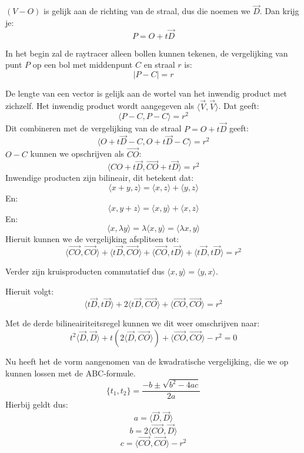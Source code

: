\documentclass[12pt, a4paper]{article}
\begin{document}
$(V-O)$ is gelijk aan de richting van de straal, dus die noemen we $\overrightarrow{D}$. Dan krijg je:
\[P=O+t\overrightarrow{D}\]

In het begin zal de raytracer alleen bollen kunnen tekenen, de vergelijking van punt $P$ op een bol met middenpunt $C$ en straal $r$ is:
\[|P-C|=r\]

De lengte van een vector is gelijk aan de wortel van het inwendig product met zichzelf. Het inwendig product wordt aangegeven als $\langle\overrightarrow{V},\overrightarrow{V} \rangle$. Dat geeft:
\[\langle P-C,P-C\rangle=r^2\]
Dit combineren met de vergelijking van de straal $P=O+t\overrightarrow{D}$ geeft:
\[\langle O+t\overrightarrow{D}-C,O+t\overrightarrow{D}-C\rangle=r^2\]
$O-C$ kunnen we opschrijven als $\overrightarrow{CO}$:
\[\langle{CO}+t\overrightarrow{D},\overrightarrow{CO}+t\overrightarrow{D}\rangle=r^2\]
Inwendige producten zijn bilineair, dit betekent dat:
\[\langle x+y,z\rangle=\langle x,z\rangle+\langle y,z\rangle\]
En:
\[\langle x,y+z\rangle=\langle x,y\rangle+\langle x,z\rangle\]
En:
\[\langle x,\lambda y\rangle=\lambda\langle x,y\rangle=\langle\lambda x,y\rangle\]
Hieruit kunnen we de vergelijking afsplitsen tot:
\[\langle \overrightarrow{CO},\overrightarrow{CO} \rangle + \langle t\overrightarrow{D},\overrightarrow{CO} \rangle + \langle \overrightarrow{CO},t\overrightarrow{D} \rangle + \langle t\overrightarrow{D},t\overrightarrow{D} \rangle = r^2\]

Verder zijn kruisproducten commutatief dus $\langle x,y\rangle=\langle y,x\rangle$.

Hieruit volgt:
\[\langle t\overrightarrow{D},t\overrightarrow{D} \rangle + 2\langle t\overrightarrow{D},\overrightarrow{CO} \rangle + \langle \overrightarrow{CO},\overrightarrow{CO} \rangle = r^2\]

Met de derde bilineairiteitsregel kunnen we dit weer omschrijven naar:
\[t^2\langle \overrightarrow{D},\overrightarrow{D} \rangle + t\left(2\langle \overrightarrow{D},\overrightarrow{CO} \rangle
\right) + \langle \overrightarrow{CO},\overrightarrow{CO} \rangle - r^2 = 0\]

Nu heeft het de vorm aangenomen van de kwadratische vergelijking, die we op kunnen lossen met de ABC-formule.
\[\{t_1, t_2\}=\frac{-b\pm \sqrt{b^2-4ac}}{2a}\]
Hierbij geldt dus:
\[a=\langle \overrightarrow{D},\overrightarrow{D}\rangle\]
\[b=2\langle \overrightarrow{CO},\overrightarrow{D}\rangle\]
\[c=\langle \overrightarrow{CO},\overrightarrow{CO}\rangle-r^2\]
\end{document}
